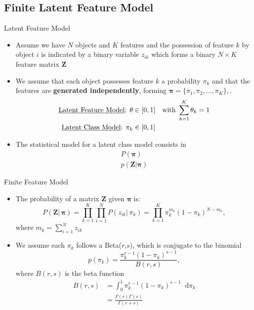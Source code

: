 \documentclass[aspectratio=169,xcolor=dvipsnames]{beamer}
\newcommand*\diff{\mathop{}\!\mathrm{d}}
\newcommand{\vecpi}{\boldsymbol{\pi}}
\newcommand{\matz}{\textbf{Z}}
\begin{document}
\subsection{Finite Latent Feature Model}
\begin{frame}{Latent Feature Model}
\setlength{\leftmargini}{0.2cm}
\begin{itemize}
\item Assume we have $N$ objects and $K$ features and the possession of feature $k$ by object $i$ is indicated by a binary variable $z_{ik}$ which forms a binary $N \times K$ feature matrix $\matz$ 
\item We assume that each object possesses feature $k$ a probability $\pi_k$ and that
the features are \textbf{generated independently}, forming $\vecpi = \{\pi_1,\pi_2,\dots,\pi_K\},$.
\begin{align*}
    \text{\underline{Latent Feature Model}: } \theta &\in [0,1] \quad \text{with }\sum_{k=1}^{K} \theta_k=1 \\
    \text{\underline{Latent Class Model}: } \pi_k &\in [0,1]
\end{align*}
\item The statistical model for a latent class model consists in
\begin{gather*}
  P(\vecpi) \\
  p(\matz|\vecpi)   
\end{gather*}
\end{itemize}
\end{frame}
\begin{frame}{Finite Feature Model}
\setlength{\leftmargini}{0.2cm}
\begin{itemize}
\item The probability of a matrix $\matz$ given $\vecpi$ is:
\begin{equation*}
    P(\matz | \, \vecpi) = \prod_{k=1}^{K}\prod_{i=1}^{N}P(z_{ik}|\, \pi_{k})=\prod_{k=1}^{K}\pi_{k}^{m_k}(1-\pi_{k})^{N-m_k},
\end{equation*}
where $m_k=\sum_{i=1}^{N}z_{ik}$
\item We assume each $\pi_k$ follows a Beta($r$,$s$), which is conjugate to the binomial
\begin{equation*}
    p(\pi_k) = \frac{\pi_k^{r-1}(1-\pi_k)^{s-1}}{B(r,s)},
\end{equation*}
where $B(r,s)$ is the beta function
\begin{align*}
    B(r,s) &= \int_{0}^{1}\pi_k^{r-1}(1-\pi_k)^{s-1} \diff \pi_k \\
    &= \frac{\Gamma(r)\Gamma(s)}{\Gamma(r+s)}
\end{align*}
\end{itemize}
\end{frame}
\end{document}
